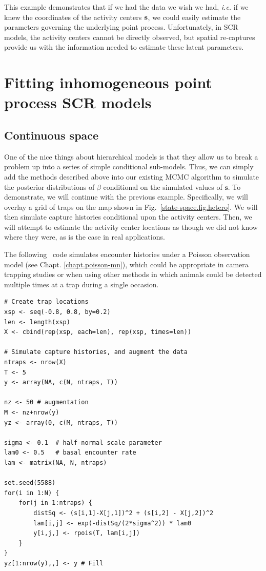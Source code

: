 This example demonstrates
that if we had the data we wish we had, {\it i.e.} if we knew the
coordinates of the activity centers $\bf s$, we could easily estimate the
parameters governing the underlying point process. Unfortunately, in
SCR models, the activity centers cannot be directly observed, but
spatial re-captures provide us with the information needed to
estimate these latent parameters.

\section{Fitting inhomogeneous point process SCR models}

\subsection{Continuous space}

One of the nice things about hierarchical models is that they allow us
to break a problem up into a series of simple conditional
sub-models. Thus,
we can simply add the methods described above into our existing MCMC
algorithm to simulate the posterior distributions of $\beta$ conditional on the
simulated values of $\mathbf{s}$. To demonstrate, we will continue with
the previous example. Specifically, we will overlay a grid of
traps on the map shown in Fig.~\ref{state-space.fig.hetero}. We will then
simulate capture histories conditional upon the activity
centers. Then, we will attempt to estimate the activity center
locations as though we did not know where they were, as is the case in
real applications.

The following \R~code simulates encounter histories under a
Poisson observation model (see Chapt. \ref{chapt.poisson-mn}), which could be appropriate in camera
trapping studies or when using other methods in which animals could
be detected multiple times at a trap during a single occasion.

\begin{small}
\begin{verbatim}
# Create trap locations
xsp <- seq(-0.8, 0.8, by=0.2)
len <- length(xsp)
X <- cbind(rep(xsp, each=len), rep(xsp, times=len))

# Simulate capture histories, and augment the data
ntraps <- nrow(X)
T <- 5
y <- array(NA, c(N, ntraps, T))

nz <- 50 # augmentation
M <- nz+nrow(y)
yz <- array(0, c(M, ntraps, T))

sigma <- 0.1  # half-normal scale parameter
lam0 <- 0.5   # basal encounter rate
lam <- matrix(NA, N, ntraps)

set.seed(5588)
for(i in 1:N) {
    for(j in 1:ntraps) {
        distSq <- (s[i,1]-X[j,1])^2 + (s[i,2] - X[j,2])^2
        lam[i,j] <- exp(-distSq/(2*sigma^2)) * lam0
        y[i,j,] <- rpois(T, lam[i,j])
    }
}
yz[1:nrow(y),,] <- y # Fill
\end{verbatim}
\end{small}

